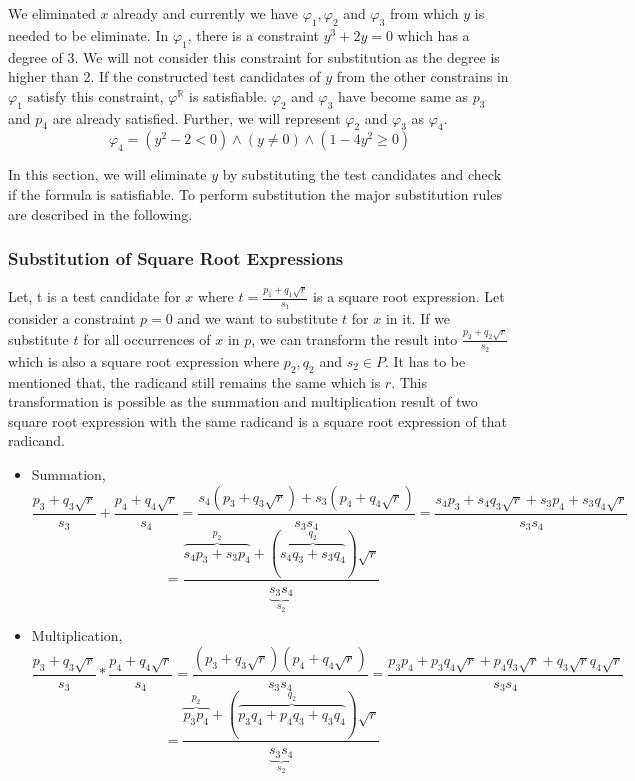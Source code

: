 We eliminated $x$ already and currently we have $\varphi_{1},\varphi_{2}$ and $\varphi_{3}$ from which $y$ is needed to be eliminate. In $\varphi_{1}$, there is a constraint $y^{3}+2y = 0$ which has a degree of 3. We will not consider this constraint for substitution as the degree is higher than 2. If the constructed test candidates of $y$ from the other constrains in $\varphi_{1}$ satisfy this constraint, $\varphi^{\mathbb{R}}$ is satisfiable. $\varphi_{2}$ and $\varphi_{3}$ have become same as $p_{3}$ and $p_{4}$ are already satisfied. Further, we will represent $\varphi_{2}$ and $\varphi_{3}$ as $\varphi_{4}$.
$$\varphi_{4} = (y^{2} - 2 < 0) \wedge (y \neq 0) \wedge (1-4y^{2}\geq 0) $$

In this section, we will eliminate $y$ by substituting the test candidates and check if the formula is satisfiable. To perform substitution the major substitution rules are described in the following.
\subsubsection{Substitution of Square Root Expressions}
Let, t is a test candidate for $x$ where $t = \frac{p_{1}+q_{1}\sqrt{r}}{s_{1}}$ is a square root expression. Let consider a constraint $p=0$ and we want to substitute $t$ for $x$ in it. If we substitute $t$ for all occurrences of $x$ in $p$, we can transform the result into $\frac{p_{2}+q_{2}\sqrt{r}}{s_{2}}$ which is also a square root expression where $p_{2}, q_{2}$ and $s_{2}\in P$. It has to be mentioned that, the radicand still remains the same which is $r$.
This transformation is possible as the summation and multiplication result of two square root expression with the same radicand is a square root expression of that radicand.
\begin{itemize}
	\item Summation,
	$$ \frac{p_{3}+q_{3}\sqrt{r}}{s_{3}}+\frac{p_{4}+q_{4}\sqrt{r}}{s_{4}} = \frac{s_{4}(p_{3}+q_{3}\sqrt{r})+s_{3}(p_{4}+q_{4}\sqrt{r})}{s_{3}s_{4}} = \frac{s_{4}p_{3}+s_{4}q_{3}\sqrt{r}+s_{3}p_{4}+s_{3}q_{4}\sqrt{r}}{s_{3}s_{4}}$$
	$$ =\frac{\overbrace{s_{4}p_{3}+s_{3}p_{4}}\limits^{p_{2}}+(\overbrace{s_{4}q_{3}+s_{3}q_{4}}\limits^{q_{2}})\sqrt{r}}{\underbrace{s_{3}s_{4}}\limits_{s_{2}}}$$
	\item Multiplication,
	$$ \frac{p_{3}+q_{3}\sqrt{r}}{s_{3}}*\frac{p_{4}+q_{4}\sqrt{r}}{s_{4}} =
	\frac{(p_{3}+q_{3}\sqrt{r})(p_{4}+q_{4}\sqrt{r})}{s_{3}s_{4}} =
	\frac{p_{3}p_{4}+p_{3}q_{4}\sqrt{r}+p_{4}q_{3}\sqrt{r}+q_{3}\sqrt{r}q_{4}\sqrt{r}}{s_{3}s_{4}}$$
	$$
	=\frac{\overbrace{p_{3}p_{4}}\limits^{p_{2}}+(\overbrace{p_{3}q_{4}+p_{4}q_{3}+q_{3}q_{4}}\limits^{q_{2}})\sqrt{r}}{\underbrace{s_{3}s_{4}}\limits_{s_{2}}}$$
\end{itemize}

